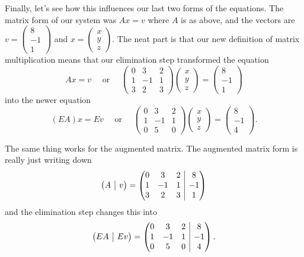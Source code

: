 \documentclass[10pt,]{book}
\makeatletter
\theoremstyle{plain}
\theoremstyle{definition}
\numberwithin{equation}{section}
\newcommand{\augmatrix}[2]{\left(\begin{array}{@{}#1 |c@{}} #2 \end{array}\right)}
\makeatother
\begin{document}
        Finally, let's see how this influences our last two forms of the equations.
        The matrix form of our system was \(Ax = v\) where \(A\) is as above, and the
        vectors are \(v = \left(\begin{smallmatrix} 8 \\ -1 \\ 1
        \end{smallmatrix}\right)\) and
        \(x = \left( \begin{smallmatrix} x \\ y \\ z \end{smallmatrix}\right)\).
        The neat part is that our new definition of matrix multiplication means
        that our elimination step transformed the equation
        \[
          Ax = v \quad \text{ or }\quad
          \begin{pmatrix} 0 &3 &2 \\ 1 &-1 &1 \\ 3 &2 &3
          \end{pmatrix} \begin{pmatrix} x \\ y \\ z \end{pmatrix} =
          \begin{pmatrix} 8 \\ -1 \\ 1 \end{pmatrix}
        \]
        into the newer equation
        \[
          (EA) x = Ev \quad \text{ or } \quad \begin{pmatrix} 0 &3 &2
          \\ 1 &-1 &1 \\ 0 &5 &0 \end{pmatrix} \begin{pmatrix} x
          \\ y \\ z \end{pmatrix} = \begin{pmatrix} 8 \\ -1 \\ 4 \end{pmatrix}.
        \]
\par

        The same thing works for the augmented matrix. The augmented matrix form
        is really just writing down
        \[
          \augmatrix{c}{A &v }
          =\augmatrix{ccc}{
          0 &3 &2 &8\\ 1 &-1 &1 &-1\\ 3 &2 &3 &1 }
        \]
        and the elimination step changes this into
        \[
          \augmatrix{c}{EA &Ev}
          = \augmatrix{ccc}{
          0 &3 &2 &8 \\ 1 &-1 &1 &-1 \\ 0 &5 &0 &4
          }.
        \]
\typeout{************************************************}
\typeout{************************************************}
\end{document}

